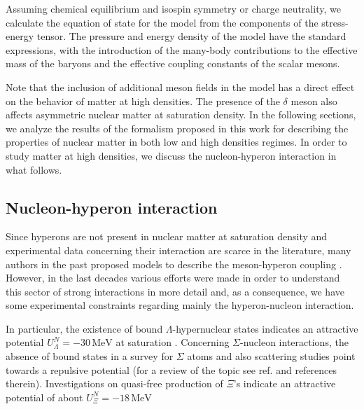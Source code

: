 \documentclass[twocolumn,showpacs,aps]{revtex4}
\begin{document}
Assuming chemical equilibrium and isospin symmetry or charge neutrality, 
we calculate the equation of state for the model from the components of the stress-energy tensor. 
The pressure and energy density of the model have the standard expressions, with the introduction of the many-body contributions
to the effective mass of the baryons and the effective coupling constants of the scalar mesons.

Note that the inclusion of additional meson fields in the model has a direct effect on the behavior of matter at high densities.
The presence of the $\delta$ meson also affects asymmetric nuclear matter at 
saturation density. In the following sections, we analyze the results of the formalism proposed in this 
work for describing the properties of nuclear matter in both low and high densities regimes.
In order to study matter at high densities, we discuss the nucleon-hyperon interaction in what follows.


\subsection{Nucleon-hyperon interaction} \label{hyperon_coupling_section}

Since hyperons are not present in nuclear matter at saturation density and 
experimental data concerning their interaction are scarce in the literature, 
many authors in the past proposed models to describe the meson-hyperon coupling \cite{Moszkowski:1974gj, Glendenning:1991es, Pal:1999sq}. 
However, in the last decades various efforts were made in order to understand this sector of strong interactions
in more detail and, as a consequence, we have some experimental constraints regarding mainly the hyperon-nucleon interaction. 

In particular, the existence of bound $\Lambda$-hypernuclear states indicates an attractive potential $U_{\Lambda}^N=-30\, \mathrm{MeV}$
  at saturation \cite{Millener:1988hp}.
Concerning $\Sigma$-nucleon interactions, the absence of bound states in a survey for $\Sigma$ atoms \cite{Mares:1995bm,Bart:1999uh} 
and also scattering studies point towards a repulsive potential (for a review of the topic see ref. \cite{Friedman:2007zza} and references therein).
Investigations on quasi-free production of $\Xi$'s indicate an attractive potential of about $U_{\Xi}^N=-18\, \mathrm{MeV}$
  
\end{document}
